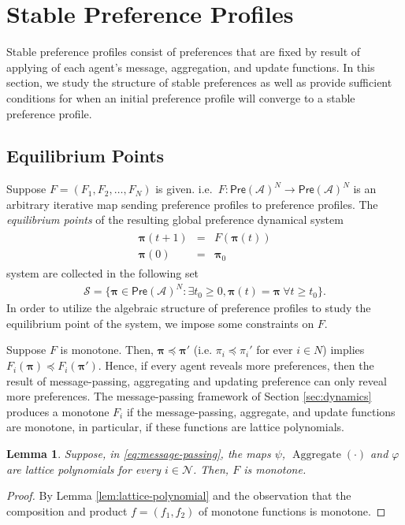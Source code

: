 \documentclass[conference]{ieeeconf}
\newcommand{\N}{\mathcal{N}}
\newcommand{\A}{\mathcal{A}}
\renewcommand{\SS}{\mathcal{S}}
\newcommand{\Pref}{\mathsf{Pre}}
\newcommand{\profile}{\boldsymbol{\pi}}
\renewcommand{\geq}{\geqslant}
\DeclareMathOperator{\Aggregate}{Aggregate}
\newtheorem{lemma}{Lemma}
\begin{document}
\section{Stable Preference Profiles}
\label{sec:stable}

Stable preference profiles consist of preferences that are fixed by result of applying of each agent's message, aggregation, and update functions. In this section, we study the structure of stable preferences as well as provide sufficient conditions for when an initial preference profile will converge to a stable preference profile.

\subsection{Equilibrium Points}

Suppose $F = (F_1,F_2,\dots,F_N)$ is given. i.e.~$F: \Pref(\A)^N \to \Pref(\A)^N$ is an arbitrary iterative map sending preference profiles to preference profiles. The \emph{equilibrium points} of the resulting global preference dynamical system
\begin{align}
    \begin{aligned}
        \profile(t+1) &=& F\left( \profile(t) \right) \\
        \profile(0) &=& \profile_0
    \end{aligned} \label{eq:global-pi}
\end{align}
system are collected in the following set
\begin{align*}
    \SS = \{\profile \in \Pref(\A)^N : \exists t_0 \geq 0, \profile(t) = \profile~\forall t \geq t_0\}.
\end{align*}
In order to utilize the algebraic structure of preference profiles to study the equilibrium point of the system, we impose some constraints on $F$. 

Suppose $F$ is monotone. Then, $\profile \preceq \profile'$ (i.e. $\pi_i \preceq \pi_i'$ for ever $i \in N$) implies $F_i(\profile) \preceq F_i(\profile')$. Hence, if every agent reveals more preferences, then the result of message-passing, aggregating and updating preference can only reveal more preferences. The message-passing framework of Section \ref{sec:dynamics} produces a monotone $F_i$ if the message-passing, aggregate, and update functions are monotone, in particular, if these functions are lattice polynomials.

\begin{lemma} \label{lem:message-passing}
    Suppose, in \eqref{eq:message-passing}, the maps $\psi$, $\Aggregate(\cdot)$ and $\varphi$ are lattice polynomials for every $i \in \N$. Then, $F$ is monotone.
\end{lemma}
\begin{proof}
    By Lemma \ref{lem:lattice-polynomial} and the observation that the composition and product $f = (f_1,f_2)$ of monotone functions is monotone.
\end{proof}
\end{document}
